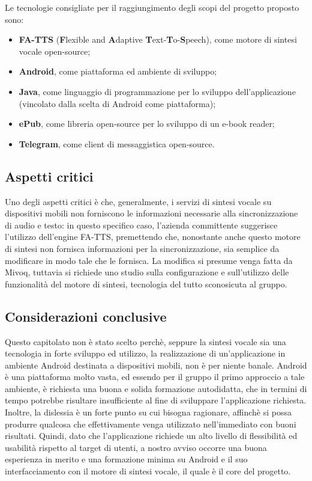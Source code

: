 Le tecnologie consigliate per il raggiungimento degli scopi del progetto
proposto sono:
\begin{itemize}
	\item \textbf{FA-TTS} (\textbf{F}lexible and \textbf{A}daptive \textbf{T}ext-\textbf{T}o-\textbf{S}peech),
	come motore di sintesi vocale open-source;
	\item \textbf{Android}, come piattaforma ed ambiente di sviluppo;
	\item \textbf{Java}, come linguaggio di programmazione per lo sviluppo dell'applicazione
	(vincolato dalla scelta di Android come piattaforma);
	\item \textbf{ePub}, come libreria open-source per lo sviluppo di un e-book
	reader;
	\item \textbf{Telegram}, come client di messaggistica open-source.
\end{itemize}

\subsection{Aspetti critici}

Uno degli aspetti critici è che, generalmente, i servizi di sintesi
vocale su dispositivi mobili non forniscono le informazioni necessarie
alla sincronizzazione di audio e testo: in questo specifico caso,
l'azienda committente suggerisce l'utilizzo dell'engine FA-TTS,
premettendo che, nonostante anche questo motore di sintesi non fornisca
informazioni per la sincronizzazione, sia semplice da modificare in
modo tale che le fornisca. La modifica si presume venga fatta da Mivoq,
tuttavia si richiede uno studio sulla configurazione e sull'utilizzo
delle funzionalità del motore di sintesi, tecnologia del tutto sconosicuta al gruppo. 

\subsection{Considerazioni conclusive}

Questo capitolato non è stato scelto perchè, seppure
la sintesi vocale sia una tecnologia in forte sviluppo ed utilizzo,
la realizzazione di un'applicazione in ambiente Android destinata
a dispositivi mobili, non è per niente banale. Android è una piattaforma
molto vasta, ed essendo per il gruppo il primo approccio a tale ambiente,
è richiesta una buona e solida formazione autodidatta, che in termini
di tempo potrebbe risultare insufficiente al fine di sviluppare l'applicazione
richiesta. Inoltre, la dislessia è un forte punto su cui bisogna ragionare,
affinchè si possa produrre qualcosa che effettivamente venga utilizzato
nell'immediato con buoni risultati. Quindi, dato che l'applicazione
richiede un alto livello di flessibilità ed usabilità rispetto al
target di utenti, a nostro avviso occorre una buona esperienza in
merito e una formazione minima su Android e il suo interfacciamento
con il motore di sintesi vocale, il quale è il core del progetto.